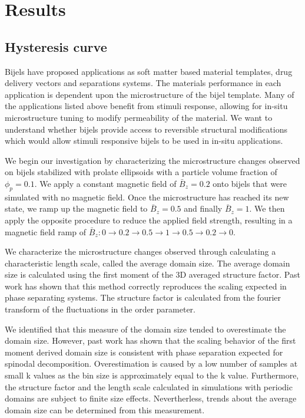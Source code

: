 
\section{Results}\label{sec:results_p2}

\subsection{Hysteresis curve}

Bijels have proposed applications as soft matter based material templates, drug delivery vectors and separations systems. 
The materials performance in each application is dependent upon the microstructure of the bijel template. Many of the 
applications listed above benefit from stimuli response, allowing for in-situ microstructure tuning to modify permeability 
of the material. We want to understand whether bijels provide access to reversible structural modifications which would 
allow stimuli responsive bijels to be used in in-situ applications.

We begin our investigation by characterizing the microstructure changes observed on bijels stabilized with prolate 
ellipsoids with a particle volume fraction of $\phi_p = 0.1$. We apply a constant magnetic field of $\bar{B}_z = 0.2$ 
onto bijels that were simulated with no magnetic field. Once the microstructure has reached its new state, we ramp up 
the magnetic field to $\bar{B}_z = 0.5$ and finally $\bar{B}_z = 1$. We then apply the opposite procedure to reduce 
the applied field strength, resulting in a magnetic field ramp of 
$\bar{B}_z: 0 \rightarrow 0.2 \rightarrow 0.5 \rightarrow 1 \rightarrow 0.5 \rightarrow 0.2 \rightarrow 0$.

We characterize the microstructure changes observed through calculating a characteristic length scale, 
called the average domain size. The average domain size is calculated using the first moment of the 3D 
averaged structure factor. Past work has shown that this method correctly reproduces the scaling expected 
in phase separating systems. The structure factor is calculated from the fourier transform of the fluctuations 
in the order parameter. \cite{kendon_inertial_2001}

We identified that this measure of the domain size tended to overestimate the domain size. However, past work has 
shown that the scaling behavior of the first moment derived domain size is consistent with phase separation expected 
for spinodal decomposition. Overestimation is caused by a low number of samples at small k values as the bin size is 
approximately equal to the k value. Furthermore, the structure factor and the length scale calculated in simulations
 with periodic domains are subject to finite size effects. Nevertherless, trends about the average domain size can be 
 determined from this measurement.

